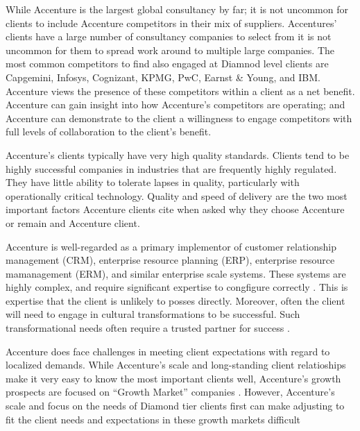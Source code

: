 While Accenture is the largest global consultancy by far; it is not uncommon for clients to include Accenture competitors in their mix of suppliers. Accentures' clients have a large number of consultancy companies to select from it is not uncommon for them to spread work around to multiple large companies. The most common competitors to find also engaged at Diamnod level clients are Capgemini, Infosys, Cognizant, KPMG, PwC, Earnst \& Young, and IBM.  Accenture views the presence of these competitors within a client as a net benefit. Accenture can gain insight into how Accenture's competitors are operating; and Accenture can demonstrate to the client a willingness to engage competitors with full levels of collaboration to the client's benefit.

Accenture's clients typically have very high quality standards. Clients tend to be highly successful companies in industries that are frequently highly regulated. They have little ability to tolerate lapses in quality, particularly with operationally critical technology. Quality and speed of delivery are the two most important factors Accenture clients cite when asked why they choose Accenture or remain and Accenture client.

Accenture is well-regarded as a primary implementor of customer relationship management (CRM), enterprise resource planning (ERP), enterprise resource mamanagement (ERM), and similar enterprise scale systems. These systems are highly complex, and require significant expertise to congfigure correctly \parencite{aboabdoImplementingEnterpriseResource2019, farhanSystematicReviewDetermination2018}. This is expertise that the client is unlikely to posses directly. Moreover, often the client will need to engage in cultural transformations to be successful. Such transformational needs often require a trusted partner for success \parencite{kimpelMeasuringImpactCulture2020}.

Accenture does face challenges in meeting client expectations with regard to localized demands. While Accenture's scale and long-standing client relatioships make it very easy to know the most important clients well, Accenture's growth prospects are focused on ``Growth Market'' companies \parencite{AccenturePLC2019}. However, Accenture's scale and focus on the needs of Diamond tier clients first can make adjusting to fit the client needs and expectations in these growth markets difficult \parencite{tinneStrategicIssuesAccenture2016}

